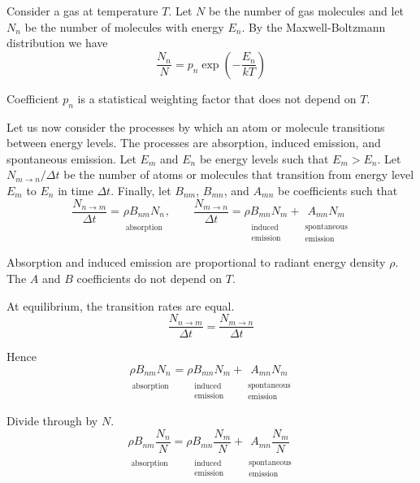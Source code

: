 \documentclass[12pt]{article}
\newcommand\BNM{B_{nm}} %
\newcommand\BMN{B_{mn}} %
\newcommand\AMN{A_{mn}} %
\newcommand\RHO{\rho}
\newcommand\ABSORPTION{\substack{\\[1ex] \text{absorption}}}
\newcommand\INDUCED{\substack{\\[1ex] \text{induced}\\ \text{emission}}}
\newcommand\SPONTANEOUS{\substack{\\[1ex] \text{spontaneous}\\ \text{emission}}}
\begin{document}

Consider a gas at temperature $T$.
Let $N$ be the number of gas molecules
and let $N_n$ be the number of molecules with energy $E_n$.
By the Maxwell-Boltzmann distribution we have
\begin{equation*}
\frac{N_n}{N}=p_n\exp\left(-\frac{E_n}{kT}\right)
\tag{1}
\end{equation*}

Coefficient $p_n$ is a statistical weighting factor that does not depend on $T$.

\bigskip
Let us now consider the processes by which an atom or molecule transitions between energy levels.
The processes are absorption, induced emission, and spontaneous emission.
Let $E_m$ and $E_n$ be energy levels such that $E_m>E_n$.
Let $N_{m\rightarrow n}/\Delta t$ be the number of atoms or molecules that transition from energy level $E_m$ to $E_n$ in time $\Delta t$.
Finally, let $\BNM$, $\BMN$, and $\AMN$ be coefficients such that
\begin{equation*}
\frac{N_{n\rightarrow m}}{\Delta t}
=\underset{\ABSORPTION}{\RHO\BNM N_n},
\qquad
\frac{N_{m\rightarrow n}}{\Delta t}
=\underset{\INDUCED}{\RHO\BMN N_m}
+
\underset{\SPONTANEOUS}{\AMN N_m}
\end{equation*}

Absorption and induced emission are proportional to radiant energy density $\rho$.
The $A$ and $B$ coefficients do not depend on $T$.

\bigskip
At equilibrium, the transition rates are equal.
\begin{equation*}
\frac{N_{n\rightarrow m}}{\Delta t}=\frac{N_{m\rightarrow n}}{\Delta t}
\end{equation*}

Hence
\begin{equation*}
\underset{\ABSORPTION}{\RHO\BNM N_n}
=\underset{\INDUCED}{\RHO\BMN N_m}
+\underset{\SPONTANEOUS}{\AMN N_m}
\end{equation*}

Divide through by $N$.
\begin{equation*}
\underset{\ABSORPTION}{\RHO\BNM \frac{N_n}{N}}
=\underset{\INDUCED}{\RHO\BMN \frac{N_m}{N}}
+\underset{\SPONTANEOUS}{\AMN \frac{N_m}{N}}
\end{equation*}
\end{document}
